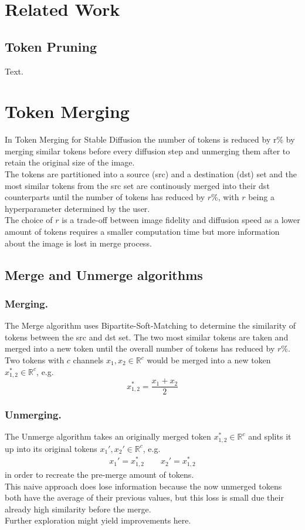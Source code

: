 \documentclass{article}
\begin{document}
\newpage
\section{Related Work}

\subsection{Token Pruning}
Text.





\newpage
\section{Token Merging}
In Token Merging for Stable Diffusion\cite{bolya2023tomesd} the number of tokens is reduced by r\% by merging similar tokens before every diffusion step and unmerging them after to retain the original size of the image.\\ The tokens are partitioned into a source (src) and a destination (dst) set and the most similar tokens from the src set are continously merged into their dst counterparts until the number of tokens has reduced by \(r\)\%, with \(r\) being a hyperparameter determined by the user.\\ The choice of \(r\) is a trade-off between image fidelity and diffusion speed as a lower amount of tokens requires a smaller computation time but more information about the image is lost in merge process.

\subsection{Merge and Unmerge algorithms}
\subsubsection*{Merging.} The Merge algorithm uses Bipartite-Soft-Matching to determine the similarity of tokens between the src and dst set. The two most similar tokens are taken and merged into a new token until the overall number of tokens has reduced by \(r\)\%.\\
Two tokens with \(c\) channels \(x_1, x_2  \in \mathbb{R}^c\) would be merged into a new token \(x_{1,2}^* \in \mathbb{R}^c \), e.g. \[x_{1,2}^* = \frac{x_1 + x_2}{2}\]

\subsubsection*{Unmerging.} The Unmerge algorithm takes an originally merged token $x_{1,2}^* \in \mathbb{R}^c$ and splits it up into its original tokens $x_1', x_2' \in \mathbb{R}^c$, e.g. 
\begin{align*}
    x_1' = x_{1,2}^* \quad\quad
    x_2' = x_{1,2}^*
\end{align*}
in order to recreate the pre-merge amount of tokens.\\
This naive approach does lose information because the now unmerged tokens both have the average of their previous values, but this loss is small due their already high similarity before the merge.\\ Further exploration might yield improvements here.
\end{document}
